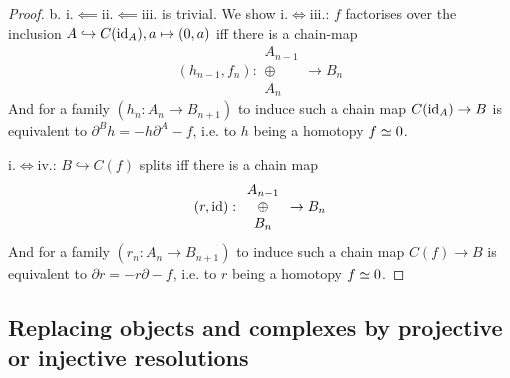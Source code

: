 \documentclass[fontsize=11pt,fleqn,a4paper]{scrartcl}
\begin{document}
\begin{proof}
\medbreak
b. i.$\impliedby$ii.$\impliedby$iii. is trivial. We show i.$\iff$iii.: $f$ factorises over the inclusion $A\hookrightarrow C(\operatorname{id}_A), a\mapsto (0,a)$ iff there is a chain-map
\[(h_{n-1}, f_n) : \begin{array}{c}A_{n-1}\\\oplus\\A_n\end{array} \to B_n\]
And for a family $(h_n: A_n\to B_{n+1})$ to induce such a chain map $C(\operatorname{id}_A)\to B$ is equivalent to $\partial^B h =-h\partial^A - f$, i.e. to $h$ being a homotopy $f \simeq 0$.

i.$\iff$iv.: $B\hookrightarrow C(f)$ splits iff there is a chain map
\[(r,\operatorname{id}) : \begin{array}{c}A_{n-1}\\\oplus\\B_n\end{array} \to B_n\]
And for a family $(r_n: A_n\to B_{n+1})$ to induce such a chain map $C(f)\to B$ is equivalent to $\partial r=-r\partial-f$, i.e. to $r$ being a homotopy $f\simeq 0$.
\end{proof}

\subsection{Replacing objects and complexes by projective or injective resolutions}
\end{document}
